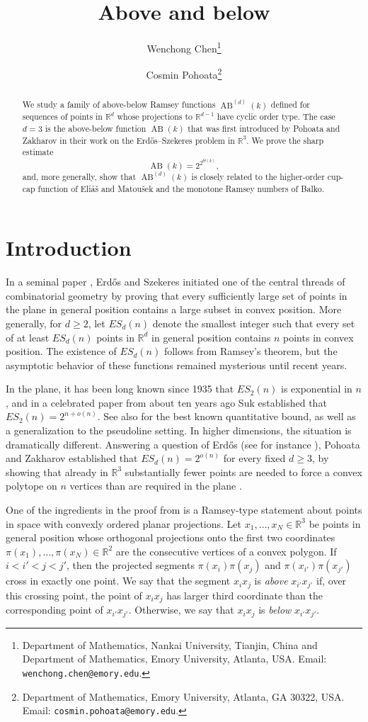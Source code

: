 \documentclass[11pt]{article}
\title{Above and below}
\author{%
  Wenchong Chen\thanks{Department of Mathematics, Nankai University, Tianjin, China and Department of Mathematics, Emory University, Atlanta, USA. Email: \texttt{wenchong.chen@emory.edu}.}
  \and
  Cosmin Pohoata\thanks{Department of Mathematics, Emory University, Atlanta, GA 30322, USA. Email: \texttt{cosmin.pohoata@emory.edu}.}
}
\date{}
\newcommand{\AB}{\operatorname{AB}}
\begin{document}
\maketitle

\begin{abstract}
We study a family of above-below Ramsey functions $\operatorname{AB}^{(d)}(k)$ defined for sequences of points in $\mathbb R^d$ whose projections to $\mathbb R^{d-1}$ have cyclic order type. The case $d=3$ is the above-below function $\AB(k)$ that was first introduced by Pohoata and Zakharov in their work on the Erd\H{o}s--Szekeres problem in $\mathbb{R}^{3}$. We prove the sharp estimate
\[
\AB(k)=2^{2^{\Theta(k)}},
\]
and, more generally, show that $\operatorname{AB}^{(d)}(k)$ is closely related to the higher-order cup-cap function of Eli\'a\v{s} and Matou\v{s}ek and the monotone Ramsey numbers of Balko.
\end{abstract}

\section{Introduction}

In a seminal paper \cite{ES35}, Erd\H{o}s and Szekeres initiated one of the central threads of combinatorial geometry by proving that every sufficiently large set of points in the plane in general position contains a large subset in convex position. More generally, for $d\ge 2$, let $ES_d(n)$ denote the smallest integer such that every set of at least $ES_d(n)$ points in $\mathbb R^d$ in general position contains $n$ points in convex position. The existence of $ES_d(n)$ follows from Ramsey's theorem, but the asymptotic behavior of these functions remained mysterious until recent years. 

In the plane, it has been long known since 1935 that $ES_2(n)$ is exponential in $n$, and in a celebrated paper from about ten years ago Suk \cite{Suk17} established that $ES_2(n)=2^{n+o(n)}$. See also \cite{HMPT20} for the best known quantitative bound, as well as a generalization to the pseudoline setting. In higher dimensions, the situation is dramatically different. Answering a question of Erd\H{o}s (see for instance \cite{Bloom}), Pohoata and Zakharov established that $ES_d(n)=2^{o(n)}$ for every fixed $d\ge 3$, by showing that already in $\mathbb R^3$ substantially fewer points are needed to force a convex polytope on $n$ vertices than are required in the plane \cite{PZ}.

One of the ingredients in the proof from \cite{PZ} is a Ramsey-type statement about points in space with convexly ordered planar projections. Let $x_1,\dots,x_N\in\mathbb R^3$ be points in general position whose orthogonal projections onto the first two coordinates $\pi(x_1),\dots,\pi(x_N)\in\mathbb R^2$ are the consecutive vertices of a convex polygon. If $i<i'<j<j'$, then the projected segments $\pi(x_i)\pi(x_j)$ and $\pi(x_{i'})\pi(x_{j'})$ cross in exactly one point. We say that the segment $x_i x_j$ is \emph{above} $x_{i'}x_{j'}$ if, over this crossing point, the point of $x_i x_j$ has larger third coordinate than the corresponding point of $x_{i'}x_{j'}$. Otherwise, we say that $x_i x_j$ is \emph{below} $x_{i'}x_{j'}$.
\end{document}
